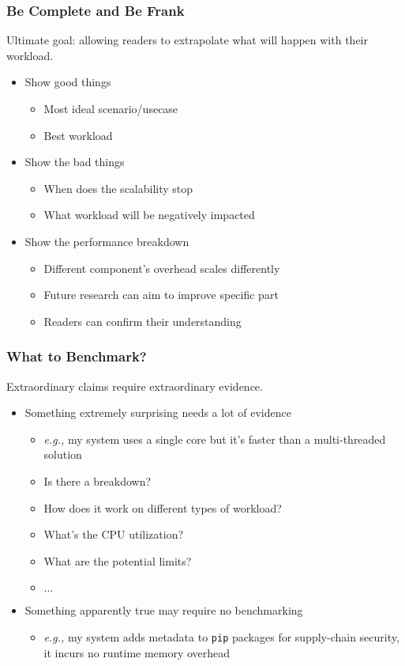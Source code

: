 \documentclass[xcolor={dvipsnames},aspectratio=149]{beamer}
\def\eg{\emph{e.g.,}\xspace}
\begin{document}
\begin{frame}
  \frametitle{Be Complete and Be Frank}
  Ultimate goal: allowing readers to extrapolate what will happen with their workload.
  \begin{itemize}
  \item Show good things
    \begin{itemize}
    \item Most ideal scenario/usecase
    \item Best workload
    \end{itemize}
  \item Show the bad things
    \begin{itemize}
    \item When does the scalability stop
    \item What workload will be negatively impacted
    \end{itemize}
  \item Show the performance breakdown
    \begin{itemize}
    \item Different component's overhead scales differently
    \item Future research can aim to improve specific part
    \item Readers can confirm their understanding
    \end{itemize}
  \end{itemize}
\end{frame}

\begin{frame}
  \frametitle{What to Benchmark?}
  Extraordinary claims require extraordinary evidence.
  \begin{itemize}
  \item Something extremely surprising needs a lot of evidence
    \begin{itemize}
    \item \eg my system uses a single core but it's faster than a multi-threaded solution
    \item Is there a breakdown?
    \item How does it work on different types of workload?
    \item What's the CPU utilization?
    \item What are the potential limits?
    \item $\ldots$
    \end{itemize}
  \item Something apparently true may require no benchmarking
    \begin{itemize}
    \item \eg my system adds metadata to \texttt{pip} packages for supply-chain security,
      it incurs no runtime memory overhead
    \end{itemize}
  \end{itemize}
\end{frame}
\end{document}
